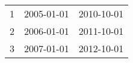 % 
\begin{tabular}{ccc}
  \hline
  \hline
1 & 2005-01-01 & 2010-10-01 \\ 
  2 & 2006-01-01 & 2011-10-01 \\ 
  3 & 2007-01-01 & 2012-10-01 \\ 
   \hline
\end{tabular}
